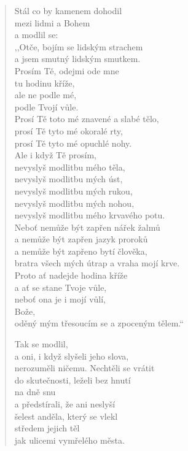 \begin{verse}
\medskip

Stál co by kamenem dohodil \\
mezi lidmi a Bohem \\
a modlil se: \\
,,Otče, bojím se lidským strachem \\
a jsem smutný lidským smutkem. \\
Prosím Tě, odejmi ode mne \\
tu hodinu kříže, \\
ale ne podle mé, \\
podle Tvojí vůle. \\
Prosí Tě toto mé znavené a slabé tělo, \\
prosí Tě tyto mé okoralé rty, \\
prosí Tě tyto mé opuchlé nohy. \\
Ale i když Tě prosím, \\
nevyslyš modlitbu mého těla, \\
nevyslyš modlitbu mých úst, \\
nevyslyš modlitbu mých rukou, \\
nevyslyš modlitbu mých nohou, \\
nevyslyš modlitbu mého krvavého potu. \\
Neboť nemůže být zapřen nářek žalmů \\
a nemůže být zapřen jazyk proroků \\
a nemůže být zapřeno bytí člověka, \\
bratra všech mých útrap a vraha mojí krve. \\
Proto ať nadejde hodina kříže \\
a ať se stane Tvoje vůle, \\
neboť ona je i mojí vůlí, \\
Bože,  \\
oděný mým třesoucím se a zpoceným tělem.``

\medskip

Tak se modlil, \\
a oni, i když slyšeli jeho slova, \\
nerozuměli ničemu. Nechtěli se vrátit \\
do skutečnosti, leželi bez hnutí \\
na dně snu \\
a předstírali, že ani neslyší \\
šelest anděla, který se vlekl \\
středem jejich těl \\
jak ulicemi vymřelého města. 


\end{verse}

